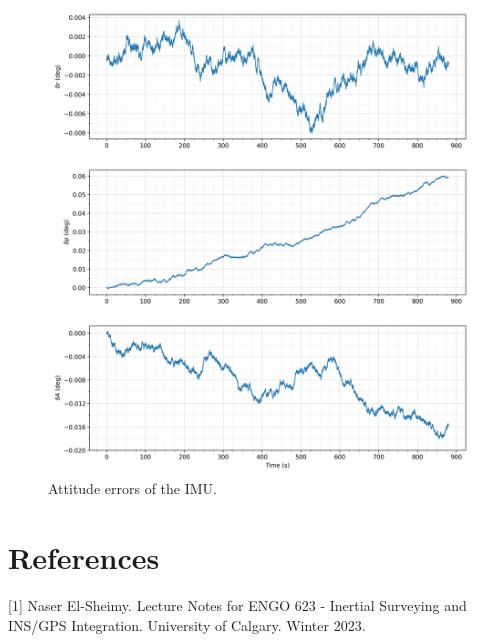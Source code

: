 \documentclass[11pt, oneside]{article}   	%
\begin{document}
\begin{figure}[!htbp]
\centerline{\includegraphics[width=16cm]{img/attitude_errors.png}}
\caption{\label{fig:attitude-errors} Attitude errors of the IMU.}
\end{figure}


\section{References}

\begin{small}

\hangindent=0.48cm [1] Naser El-Sheimy. Lecture Notes for ENGO 623 - Inertial Surveying and INS/GPS Integration. University of Calgary. Winter 2023.

\end{small}
\end{document}
